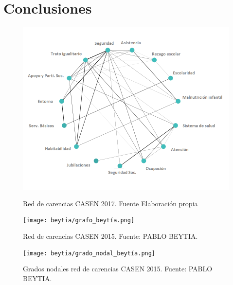 \documentclass[12pt,letterpaper,spanish]{article}
\begin{document}
\newpage
\section{Conclusiones} %





\begin{figure}[H]
  \centering
  \begin{minipage}[b]{0.49\textwidth}
    \includegraphics[width=\textwidth]{Grafos/GrafoCarencias.png}
    \caption{Red de carencias CASEN 2017. Fuente Elaboración propia}
    \label{red2017}
  \end{minipage}
  \hfill
  \begin{minipage}[b]{0.49\textwidth}
    \texttt{[image: beytia/grafo\_beytía.png]}
    \caption{Red de carencias CASEN 2015. Fuente: PABLO BEYTIA.}
    \label{red2015}
  \end{minipage}
\end{figure}




\begin{figure}[H]
    \centering
    \texttt{[image: beytia/grado\_nodal\_beytía.png]}
    \caption{Grados nodales red de carencias CASEN 2015. Fuente: PABLO BEYTIA.}
    \label{nodos2015}
\end{figure}
\end{document}
